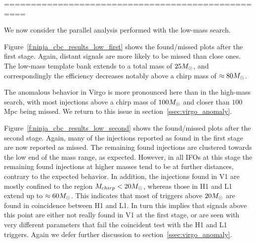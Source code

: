 ==================================================

We now consider the parallel analysis performed with the low-mass
search.

Figure~\ref{f:ninja_cbc_results_low_first} shows the found/missed
plots after the first stage.  Again, distant signals are more likely
to be missed than close ones.  The low-mass template bank extends
to a total mass of $25M_\odot$, and correspondingly the efficiency 
decreases notably above a chirp mass of $\approx 80 M_\odot$.

The anomalous behavior in Virgo is more pronounced here than in the
high-mass search, with most injections above a chirp mass of $100
M_\odot$ and closer than $100$ Mpc being missed.  We return to this
issue in section~\ref{ssec:virgo_anomaly}.

Figure~\ref{f:ninja_cbc_results_low_second} shows the found/missed
plots after the second stage.  Again, many of the injections reported
as found in the first stage are now reported as missed.  The remaining
found injections are clustered towards the low end of the mass range,
as expected.  However, in all IFOs at this stage the remaining found
injections at higher masses tend to be at further distances, contrary
to the expected behavior.  In addition, the injections found in V1 are
mostly confined to the region $M_{chirp} < 20 M_\odot$, whereas those in
H1 and L1 extend up to $\approx 60 M_\odot$.  This indicates that most
of triggers above $20 M_\odot$ are found in coincidence between H1 and
L1.  In turn this implies that signals above this point are either not
really found in V1 at the first stage, or are seen with very different 
parameters that fail the coincident test with the H1 and L1 triggers.
Again we defer further discussion to section~\ref{ssec:virgo_anomaly}.


